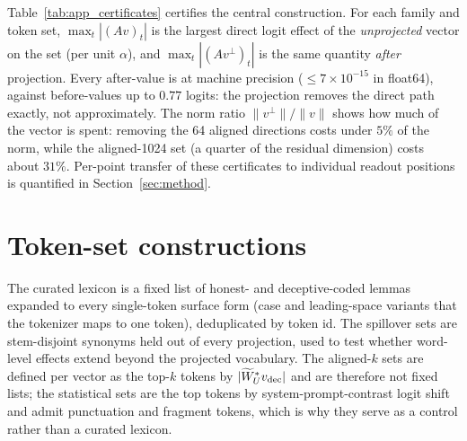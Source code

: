 Table~\ref{tab:app_certificates} certifies the central construction. For each family and token set, $\max_t |(Av)_t|$ is the largest direct logit effect of the \emph{unprojected} vector on the set (per unit $\alpha$), and $\max_t |(Av^{\perp})_t|$ is the same quantity \emph{after} projection. Every after-value is at machine precision ($\le 7\times 10^{-15}$ in float64), against before-values up to $0.77$ logits: the projection removes the direct path exactly, not approximately. The norm ratio $\|v^{\perp}\|/\|v\|$ shows how much of the vector is spent: removing the 64 aligned directions costs under $5\%$ of the norm, while the aligned-1024 set (a quarter of the residual dimension) costs about $31\%$. Per-point transfer of these certificates to individual readout positions is quantified in Section~\ref{sec:method}.

\begin{table}[h]
\centering
\small

\caption{Zero-direct-effect certificates. ``before'' is the unprojected vector's max direct effect on the set; ``after'' is the projected vector's. Random-subspace controls are omitted (they do not target the readout). Computed in float64.}
\label{tab:app_certificates}
\end{table}

\section{Token-set constructions}\label{app:tokens}

The curated lexicon is a fixed list of honest- and deceptive-coded lemmas expanded to every single-token surface form (case and leading-space variants that the tokenizer maps to one token), deduplicated by token id. The spillover sets are stem-disjoint synonyms held out of every projection, used to test whether word-level effects extend beyond the projected vocabulary. The aligned-$k$ sets are defined per vector as the top-$k$ tokens by $|\widetilde{W}_{U}^{*}v_{\mathrm{dec}}|$ and are therefore not fixed lists; the statistical sets are the top tokens by system-prompt-contrast logit shift and admit punctuation and fragment tokens, which is why they serve as a control rather than a curated lexicon.

\begin{table}[h]
\centering
\small
\begin{minipage}{\textwidth}

\end{minipage}
\caption{Curated and spillover token surface forms (the full curated and spillover sets).}
\label{tab:app_lexicon}
\end{table}

